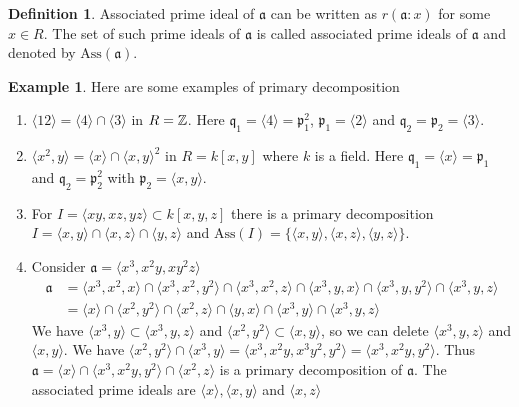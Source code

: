 \documentclass[	DIV=calc,paper=a4,fontsize=11pt]{scrartcl}	 					%
\theoremstyle{definition}
\newtheorem{defn}[thm]{Definition}
\newtheorem{exmp}[thm]{Example}
\theoremstyle{plain}
\theoremstyle{remark}
\begin{document}
\begin{defn}
Associated prime ideal of $\mathfrak{a}$ can be written as $r(\mathfrak{a}:x)$ for some $x\in R$.
The set of such prime ideals of $\mathfrak{a}$ is called associated prime ideals of $\mathfrak{a}$ and denoted by $\text{Ass}(\mathfrak{a})$.
\end{defn}
\begin{exmp}
Here are some examples of primary decomposition
\begin{enumerate}
  \item $\langle 12\rangle=\langle 4\rangle\cap\langle 3\rangle$ in $R=\Bbb Z$. Here $\mathfrak{q}_1=\langle 4\rangle=\mathfrak{p}_1^2$, $\mathfrak{p}_1=\langle 2\rangle$ and $\mathfrak{q}_2=\mathfrak{p}_2=\langle 3\rangle$.
  \item $\langle x^2,y \rangle=\langle x\rangle\cap\langle x,y\rangle^2$ in $R=k[x,y]$ where $k$ is a field. Here $\mathfrak{q}_1=\langle x\rangle=\mathfrak{p}_1$ and $\mathfrak{q}_2=\mathfrak{p}_2^2$ with $\mathfrak{p}_2=\langle x,y\rangle$.
  \item  For $I = \langle xy, xz, yz\rangle\subset k[x, y, z]$ there is a primary decomposition $I = \langle x, y\rangle\cap\langle x, z\rangle\cap\langle y, z\rangle$ and $\text{Ass}(I) = \{\langle x, y\rangle, \langle x, z\rangle, \langle y, z\rangle\}$.
  \item Consider $\mathfrak{a}=\langle x^3,x^2y,xy^2z\rangle$
  \begin{align*}
  \mathfrak{a}&=\langle x^3,x^2,x\rangle\cap\langle x^3,x^2,y^2\rangle\cap\langle x^3,x^2,z\rangle\cap\langle x^3,y,x \rangle\cap\langle x^3,y,y^2\rangle\cap\langle x^3,y,z\rangle\\
  &=\langle x\rangle\cap\langle x^2,y^2\rangle\cap\langle x^2,z\rangle\cap\langle y,x \rangle\cap\langle x^3,y\rangle\cap\langle x^3,y,z\rangle
  \end{align*}
  We have $\langle x^3,y\rangle\subset\langle x^3,y,z\rangle$ and $\langle x^2,y^2\rangle\subset \langle x,y \rangle$, so we can delete $\langle x^3,y,z\rangle$ and $\langle x,y \rangle$. We have $\langle x^2,y^2\rangle\cap\langle x^3,y\rangle=\langle x^3,x^2y,x^3y^2,y^2\rangle=\langle x^3,x^2y,y^2\rangle$. Thus $\mathfrak{a}=\langle x\rangle\cap\langle x^3,x^2y,y^2\rangle\cap\langle x^2,z\rangle$ is a primary decomposition of $\mathfrak{a}$. The associated prime ideals are $\langle x\rangle,\langle x,y\rangle$ and $\langle x,z\rangle$
\end{enumerate}
\end{exmp}
\end{document}
